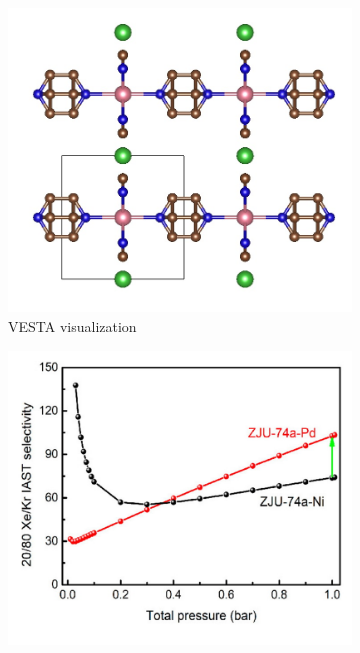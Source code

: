 \documentclass[main]{subfiles}
\begin{document}
\begin{figure}[ht]
  \centering
  \begin{subfigure}[b]{0.34\textwidth}
    \centering
    \includegraphics[width=\textwidth]{figures/6-perspectives/jacs_pei.jpg}
    \caption{VESTA visualization\autocite{VESTA}}\label{fgr:jacs_pei_struc}
  \end{subfigure}
  \hfill
  \begin{subfigure}[b]{0.34\textwidth}
    \centering
    \includegraphics[width=\textwidth]{figures/6-perspectives/jacs_pei_iast.jpg}

\end{subfigure}
\end{figure}
\end{document}
